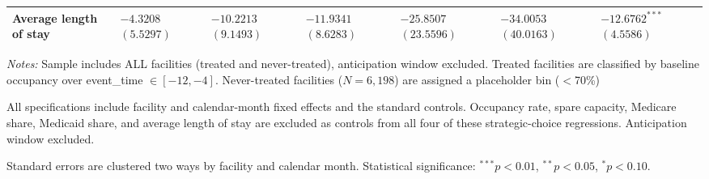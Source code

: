 \documentclass[12pt]{article}
\begin{document}
\begin{table}[H]
\begin{threeparttable}
\begin{tabularx}{\textwidth}{@{} l Y Y Y Y Y Y @{}}
Average length of stay &  &  &  &  &  &  \\
\bottomrule
\end{tabularx}

\begin{tablenotes}[flushleft]
\footnotesize
\item \textit{Notes:} Sample includes ALL facilities (treated and never-treated), anticipation window excluded. Treated facilities are classified by baseline occupancy over event\_time $\in [-12,-4]$. Never-treated facilities ($N=6,198$) are assigned a placeholder bin ($<$70\%)
\item All specifications include facility and calendar-month fixed effects and the standard controls. Occupancy rate, spare capacity, Medicare share, Medicaid share, and average length of stay are excluded as controls from all four of these strategic-choice regressions. Anticipation window excluded.
\item Standard errors are clustered two ways by facility and calendar month. Statistical significance: $^{***}p<0.01$, $^{**}p<0.05$, $^{*}p<0.10$.
\end{tablenotes}
\end{threeparttable}
\end{table}
\end{document}
